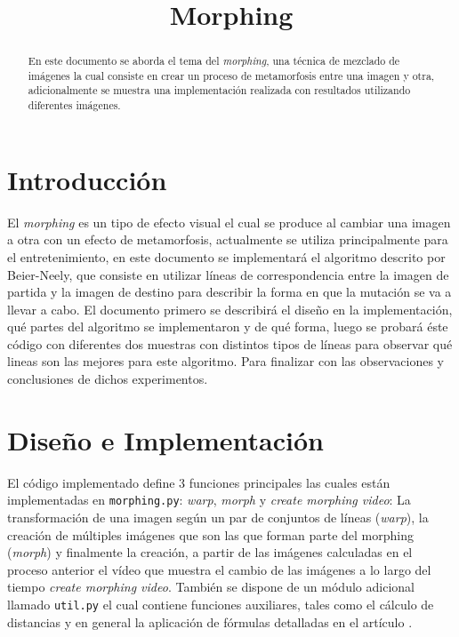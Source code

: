 \documentclass[conference]{IEEEtran}
\begin{document}
\title{Morphing}
\author{
}


\maketitle

\begin{abstract}
	En este documento se aborda el tema del \textit{morphing}, una técnica de mezclado de imágenes la cual consiste en crear un proceso de metamorfosis entre una imagen y otra, adicionalmente se muestra una implementación realizada con resultados utilizando diferentes imágenes.
\end{abstract}
 

\section*{Introducción} %
	El \textit{morphing} es un tipo de efecto visual el cual se produce al cambiar una imagen a otra con un efecto de metamorfosis, actualmente se utiliza principalmente para el entretenimiento, en este documento se implementará el algoritmo descrito por Beier-Neely\cite{Paper}, que consiste en utilizar líneas de correspondencia entre la imagen de partida y la imagen de destino para describir la forma en que la mutación se va a llevar a cabo. El documento primero se describirá el diseño en la implementación, qué partes del algoritmo se implementaron y de qué forma, luego se probará éste código con diferentes dos muestras con distintos tipos de líneas para observar qué lineas son las mejores para este algoritmo. Para finalizar con las observaciones y conclusiones de dichos experimentos.
	
	
\section*{Diseño e Implementación}
	El código implementado define 3 funciones principales las cuales están implementadas en \texttt{morphing.py}: \textit{warp}, \textit{morph} y \textit{create morphing video}: La transformación de una imagen según un par de conjuntos de líneas (\textit{warp}), la creación de múltiples imágenes que son las que forman parte del morphing (\textit{morph}) y finalmente la creación, a partir de las imágenes calculadas en el proceso anterior el vídeo que muestra el cambio de las imágenes a lo largo del tiempo \textit{create morphing video}. También se dispone de un módulo adicional llamado \texttt{util.py} el cual contiene funciones auxiliares, tales como el cálculo de distancias y en general la aplicación de fórmulas detalladas en el artículo \cite{Paper}.
	
\end{document}
